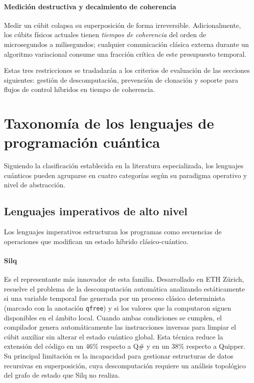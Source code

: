 \paragraph{Medición destructiva y decaimiento de coherencia}
Medir un cúbit colapsa su superposición de forma irreversible. Adicionalmente, los cúbits físicos actuales tienen \textit{tiempos de coherencia} del orden de microsegundos a milisegundos; cualquier comunicación clásica externa durante un algoritmo variacional consume una fracción crítica de este presupuesto temporal.

Estas tres restricciones se trasladarán a los criterios de evaluación de las secciones siguientes: gestión de descomputación, prevención de clonación y soporte para flujos de control híbridos en tiempo de coherencia.

\section{Taxonomía de los lenguajes de programación cuántica}

Siguiendo la clasificación establecida en la literatura especializada, los lenguajes cuánticos pueden agruparse en cuatro categorías según su paradigma operativo y nivel de abstracción.

\subsection{Lenguajes imperativos de alto nivel}

Los lenguajes imperativos estructuran los programas como secuencias de operaciones que modifican un estado híbrido clásico-cuántico.

\paragraph{Silq}
Es el representante más innovador de esta familia. Desarrollado en ETH Zürich, resuelve el problema de la descomputación automática analizando estáticamente si una variable temporal fue generada por un proceso clásico determinista (marcado con la anotación \lstinline|qfree|) y si los valores que la computaron siguen disponibles en el ámbito local. Cuando ambas condiciones se cumplen, el compilador genera automáticamente las instrucciones inversas para limpiar el cúbit auxiliar sin alterar el estado cuántico global. Esta técnica reduce la extensión del código en un 46\% respecto a Q\# y en un 38\% respecto a Quipper. Su principal limitación es la incapacidad para gestionar estructuras de datos recursivas en superposición, cuya descomputación requiere un análisis topológico del grafo de estado que Silq no realiza.

